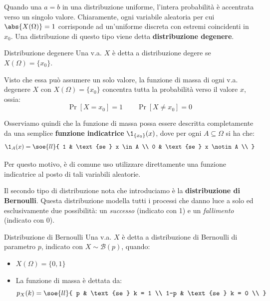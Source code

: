 \documentclass[a4paper, 12pt]{report}
\begin{document}
    Quando una $a = b$ in una distribuzione uniforme, l'intera probabilità è accentrata verso un singolo valore. Chiaramente, ogni variabile aleatoria per cui $\abs{X(\Omega)} = 1$ corrisponde ad un'uniforme discreta con estremi coincidenti in $x_0$. Una distribuzione di questo tipo viene detta \textbf{distribuzione degenere}.

    \begin{frameddefn}{Distribuzione degenere}
        Una v.a. $X$ è detta a distribuzione degere se $X(\Omega) = \{x_0\}$.
    \end{frameddefn}

    Visto che essa può assumere un solo valore, la funzione di massa di ogni v.a. degenere $X$ con $X(\Omega) = \{x_0\}$ concentra tutta la probabilità verso il valore $x$, ossia:
    \[\Pr[X = x_0] = 1 \qquad \Pr[X \neq x_0] = 0\]

    Osserviamo quindi che la funzione di massa possa essere descritta completamente da una semplice \textbf{funzione indicatrice} $\1_{\{x_0\}}(x)$, dove per ogni $A \subseteq \Omega$ si ha che:
    \[\1_{A}(x) = \soe{ll}{
        1 & \text{se } x \in A \\
        0 & \text{se } x \notin A \\
    }\]

    Per questo motivo, è di comune uso utilizzare direttamente una funzione indicatrice al posto di tali variabili aleatorie.

    Il secondo tipo di distribuzione nota che introduciamo è la \textbf{distribuzione di Bernoulli}. Questa distribuzione modella tutti i processi che danno luce a solo ed esclusivamente due possibilità: un \textit{successo} (indicato con 1) e un \textit{fallimento} (indicato con 0).

    \begin{frameddefn}{Distribuzione di Bernoulli}
        Una v.a. $X$ è detta a distribuzione di Bernoulli di parametro $p$, indicato con $X \sim \mathcal{B}(p)$, quando:
        \begin{itemize}
            \item $X(\Omega) = \{0,1\}$
            \item La funzione di massa è dettata da:
            \[p_X(k)  = \soe{ll}{
                p & \text{se } k = 1 \\
                1-p & \text{se } k = 0 \\
            }\]
        \end{itemize}
    \end{frameddefn}
    
\end{document}

